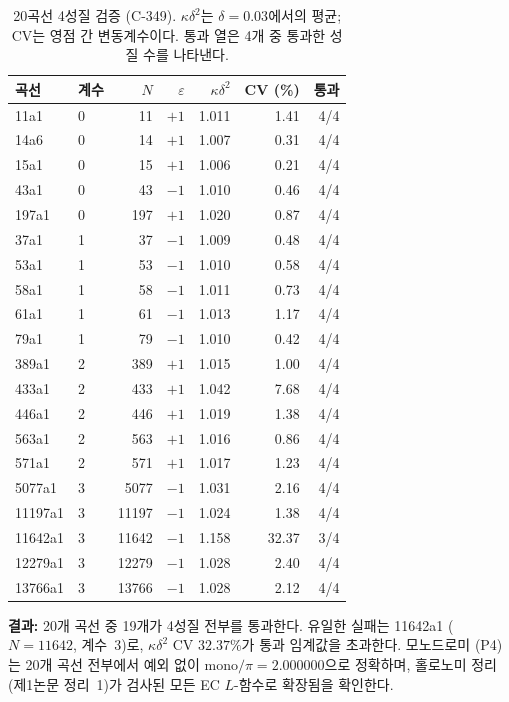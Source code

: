 \documentclass[11pt, a4paper]{article}
\theoremstyle{plain}
\theoremstyle{definition}
\begin{document}
\begin{table}[ht]
\centering
\caption{20곡선 4성질 검증 (C-349).
  $\kappa\delta^{2}$는 $\delta=0.03$에서의 평균; CV는 영점 간
  변동계수이다.  통과 열은 4개 중 통과한 성질 수를 나타낸다.}
\label{tab:20curve}
\small
\begin{tabular}{llrrrrr}
\toprule
곡선 & 계수 & $N$ & $\varepsilon$ & $\kappa\delta^{2}$ & CV (\%) & 통과 \\
\midrule
11a1    & 0 & 11    & $+1$ & 1.011 & 1.41 & 4/4 \\
14a6    & 0 & 14    & $+1$ & 1.007 & 0.31 & 4/4 \\
15a1    & 0 & 15    & $+1$ & 1.006 & 0.21 & 4/4 \\
43a1    & 0 & 43    & $-1$ & 1.010 & 0.46 & 4/4 \\
197a1   & 0 & 197   & $+1$ & 1.020 & 0.87 & 4/4 \\
\midrule
37a1    & 1 & 37    & $-1$ & 1.009 & 0.48 & 4/4 \\
53a1    & 1 & 53    & $-1$ & 1.010 & 0.58 & 4/4 \\
58a1    & 1 & 58    & $-1$ & 1.011 & 0.73 & 4/4 \\
61a1    & 1 & 61    & $-1$ & 1.013 & 1.17 & 4/4 \\
79a1    & 1 & 79    & $-1$ & 1.010 & 0.42 & 4/4 \\
\midrule
389a1   & 2 & 389   & $+1$ & 1.015 & 1.00 & 4/4 \\
433a1   & 2 & 433   & $+1$ & 1.042 & 7.68 & 4/4 \\
446a1   & 2 & 446   & $+1$ & 1.019 & 1.38 & 4/4 \\
563a1   & 2 & 563   & $+1$ & 1.016 & 0.86 & 4/4 \\
571a1   & 2 & 571   & $+1$ & 1.017 & 1.23 & 4/4 \\
\midrule
5077a1  & 3 & 5077  & $-1$ & 1.031 & 2.16 & 4/4 \\
11197a1 & 3 & 11197 & $-1$ & 1.024 & 1.38 & 4/4 \\
11642a1 & 3 & 11642 & $-1$ & 1.158 & 32.37 & 3/4 \\
12279a1 & 3 & 12279 & $-1$ & 1.028 & 2.40 & 4/4 \\
13766a1 & 3 & 13766 & $-1$ & 1.028 & 2.12 & 4/4 \\
\bottomrule
\end{tabular}
\end{table}

\textbf{결과:} 20개 곡선 중 19개가 4성질 전부를 통과한다.
유일한 실패는 11642a1 ($N=11642$, 계수~3)로,
$\kappa\delta^{2}$ CV $32.37\%$가 통과 임계값을 초과한다.
모노드로미 (P4)는 20개 곡선 전부에서 예외 없이
$\mathrm{mono}/\pi = 2.000000$으로 정확하며,
홀로노미 정리 (제1논문 정리~1)가 검사된 모든 EC $L$-함수로
확장됨을 확인한다.
\end{document}
